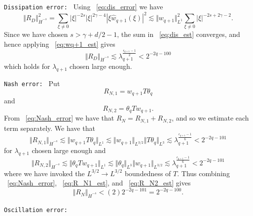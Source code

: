\documentclass[12pt,reqno,letterpaper]{amsart}
\numberwithin{equation}{section}
\newcommand{\1}{{\bf 1}}
\newcommand{\2}{{\bf 2}}
\theoremstyle{remark}
\theoremstyle{remark}
\begin{document}
\noindent\texttt{Dissipation error: } Using ~\eqref{eq:dis_error} we have
\begin{equation}\label{eq:dis_est}
    \Vert R_D \Vert_{\dot{H}^{-s}}^2 = \sum_{\xi \not =0} |\xi|^{-2s} |\xi|^{2\gamma-4} |\xi \hat{w}_{q+1}(\xi)|^2 \lesssim \Vert w_{q+1} \Vert_{L^1}^2 \sum_{\xi \not =0} |\xi|^{-2s+2\gamma-2}.
\end{equation}
Since we have chosen $s > \gamma + d/2- 1$, the sum in ~\eqref{eq:dis_est} converges, and hence applying ~\eqref{eq:wq+1_est} gives
\begin{equation}\label{eq:diss_final_est}
    \Vert R_D \Vert_{\dot{H}^{-s}} \lesssim \lambda_{q+1}^{\frac{\epsilon_{q+1}-1}{2}} < 2^{-2q-100}
\end{equation}
which holds for $\lambda_{q+1}$ chosen large enough.


\noindent\texttt{Nash error: } Put
\begin{equation*}
    R_{N,1} = w_{q+1}T\theta_q
\end{equation*}
and
\begin{equation*}
    R_{N,2} = \theta_q Tw_{q+1}.
\end{equation*}
From ~\eqref{eq:Nash_error} we have that $R_N = R_{N,1} + R_{N,2}$, and so we estimate each term separately. We have that
\begin{equation}\label{eq:R_N1_est}
    \Vert R_{N,1} \Vert_{\dot{H}^{-s}} \lesssim \Vert w_{q+1} T\theta_q \Vert_{L^1} \lesssim \Vert w_{q+1} \Vert_{L^{3/2}} \Vert T\theta_q \Vert_{L^3} \lesssim \lambda_{q+1}^{\frac{\epsilon_{q+1}-1}{6}} < 2^{-2q-101}
\end{equation}
for $\lambda_{q+1}$ chosen large enough and
\begin{equation}\label{eq:R_N2_est}
    \Vert R_{N,2} \Vert_{\dot{H}^{-s}} \lesssim \Vert \theta_q Tw_{q+1} \Vert_{L^1} \lesssim \Vert \theta_q \Vert_{L^3} \Vert w_{q+1} \Vert_{L^{3/2}} \lesssim \lambda_{q+1}^{\frac{\epsilon_{q+1}-1}{6}} < 2^{-2q-101}
\end{equation}
where we have invoked the $L^{3/2} \to L^{3/2}$ boundedness of $T$. Thus combining ~\eqref{eq:Nash_error}, ~\eqref{eq:R_N1_est}, and ~\eqref{eq:R_N2_est} gives
\begin{equation}\label{eq:Nash_final_est}
    \Vert R_N \Vert_{\dot{H}^{-s}} < (2)2^{-2q-101} = 2^{-2q-100}.
\end{equation}



\noindent\texttt{Oscillation error: } 
\end{document}
